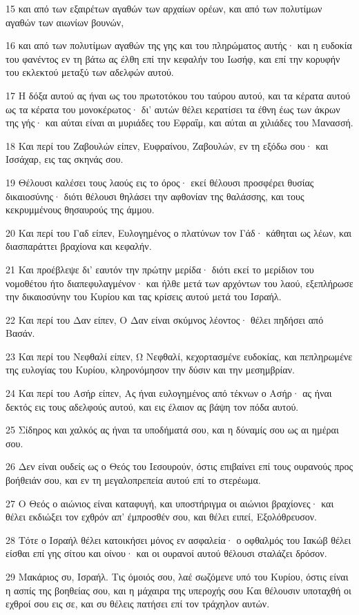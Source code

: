 \par 15 και από των εξαιρέτων αγαθών των αρχαίων ορέων, και από των πολυτίμων αγαθών των αιωνίων βουνών,
\par 16 και από των πολυτίμων αγαθών της γης και του πληρώματος αυτής· και η ευδοκία του φανέντος εν τη βάτω ας έλθη επί την κεφαλήν του Ιωσήφ, και επί την κορυφήν του εκλεκτού μεταξύ των αδελφών αυτού.
\par 17 Η δόξα αυτού ας ήναι ως του πρωτοτόκου του ταύρου αυτού, και τα κέρατα αυτού ως τα κέρατα του μονοκέρωτος· δι' αυτών θέλει κερατίσει τα έθνη έως των άκρων της γής· και αύται είναι αι μυριάδες του Εφραΐμ, και αύται αι χιλιάδες του Μανασσή.
\par 18 Και περί του Ζαβουλών είπεν, Ευφραίνου, Ζαβουλών, εν τη εξόδω σου· και Ισσάχαρ, εις τας σκηνάς σου.
\par 19 Θέλουσι καλέσει τους λαούς εις το όρος· εκεί θέλουσι προσφέρει θυσίας δικαιοσύνης· διότι θέλουσι θηλάσει την αφθονίαν της θαλάσσης, και τους κεκρυμμένους θησαυρούς της άμμου.
\par 20 Και περί του Γαδ είπεν, Ευλογημένος ο πλατύνων τον Γάδ· κάθηται ως λέων, και διασπαράττει βραχίονα και κεφαλήν.
\par 21 Και προέβλεψε δι' εαυτόν την πρώτην μερίδα· διότι εκεί το μερίδιον του νομοθέτου ήτο διαπεφυλαγμένον· και ήλθε μετά των αρχόντων του λαού, εξεπλήρωσε την δικαιοσύνην του Κυρίου και τας κρίσεις αυτού μετά του Ισραήλ.
\par 22 Και περί του Δαν είπεν, Ο Δαν είναι σκύμνος λέοντος· θέλει πηδήσει από Βασάν.
\par 23 Και περί του Νεφθαλί είπεν, Ω Νεφθαλί, κεχορτασμένε ευδοκίας, και πεπληρωμένε της ευλογίας του Κυρίου, κληρονόμησον την δύσιν και την μεσημβρίαν.
\par 24 Και περί του Ασήρ είπεν, Ας ήναι ευλογημένος από τέκνων ο Ασήρ· ας ήναι δεκτός εις τους αδελφούς αυτού, και εις έλαιον ας βάψη τον πόδα αυτού.
\par 25 Σίδηρος και χαλκός ας ήναι τα υποδήματά σου, και η δύναμίς σου ως αι ημέραι σου.
\par 26 Δεν είναι ουδείς ως ο Θεός του Ιεσουρούν, όστις επιβαίνει επί τους ουρανούς προς βοήθειάν σου, και εν τη μεγαλοπρεπεία αυτού επί το στερέωμα.
\par 27 Ο Θεός ο αιώνιος είναι καταφυγή, και υποστήριγμα οι αιώνιοι βραχίονες· και θέλει εκδιώξει τον εχθρόν απ' έμπροσθέν σου, και θέλει ειπεί, Εξολόθρευσον.
\par 28 Τότε ο Ισραήλ θέλει κατοικήσει μόνος εν ασφαλεία· ο οφθαλμός του Ιακώβ θέλει είσθαι επί γης σίτου και οίνου· και οι ουρανοί αυτού θέλουσι σταλάζει δρόσον.
\par 29 Μακάριος συ, Ισραήλ. Τις όμοιός σου, λαέ σωζόμενε υπό του Κυρίου, όστις είναι η ασπίς της βοηθείας σου, και η μάχαιρα της υπεροχής σου Και θέλουσιν υποταχθή οι εχθροί σου εις σε, και συ θέλεις πατήσει επί τον τράχηλον αυτών.

